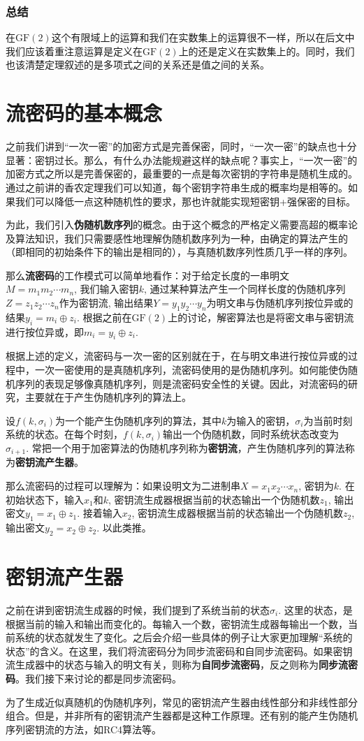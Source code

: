 \documentclass[UTF8]{ctexrep}
\def\pth#1{\left( {#1}\right)}
\def\GF{\mathrm{GF}}
\begin{document}
\subsubsection{总结}
在$\GF\pth{2}$这个有限域上的运算和我们在实数集上的运算很不一样，所以在后文中我们应该着重注意运算是定义在$\GF\pth{2}$上的还是定义在实数集上的。同时，我们也该清楚定理叙述的是多项式之间的关系还是值之间的关系。
\section{流密码的基本概念}
之前我们讲到“一次一密”的加密方式是完善保密，同时，“一次一密”的缺点也十分显著：密钥过长。那么，有什么办法能规避这样的缺点呢？事实上，“一次一密”的加密方式之所以是完善保密的，最重要的一点是每次密钥的字符串是随机生成的。通过之前讲的香农定理我们可以知道，每个密钥字符串生成的概率均是相等的。如果我们可以降低一点这种随机性的要求，那也许就能实现短密钥+强保密的目标。\par
为此，我们引入\textbf{伪随机数序列}的概念。由于这个概念的严格定义需要高超的概率论及算法知识，我们只需要感性地理解伪随机数序列为一种，由确定的算法产生的（即相同的初始条件下的输出是相同的），与真随机数序列性质几乎一样的序列。\par
那么\textbf{流密码}的工作模式可以简单地看作：对于给定长度的一串明文$M=m_1m_2\cdots m_n$, 我们输入密钥$k$, 通过某种算法产生一个同样长度的伪随机序列$Z=z_1z_2\cdots z_n$作为密钥流, 输出结果$Y=y_1y_2\cdots y_n$为明文串与伪随机序列按位异或的结果$y_i=m_i\oplus z_i$. 根据之前在$\GF\pth{2}$上的讨论，解密算法也是将密文串与密钥流进行按位异或，即$m_i=y_i\oplus z_i$.\par
根据上述的定义，流密码与一次一密的区别就在于，在与明文串进行按位异或的过程中，一次一密使用的是真随机序列，流密码使用的是伪随机序列。如何能使伪随机序列的表现足够像真随机序列，则是流密码安全性的关键。因此，对流密码的研究，主要就在于产生伪随机序列的算法上。\par
设$f(k, \sigma_i)$为一个能产生伪随机序列的算法，其中$k$为输入的密钥，$\sigma_i$为当前时刻系统的状态。在每个时刻，$f(k, \sigma_i)$输出一个伪随机数，同时系统状态改变为$\sigma_{i+1}$. 常把一个用于加密算法的伪随机序列称为\textbf{密钥流}，产生伪随机序列的算法称为\textbf{密钥流产生器}。\par
那么流密码的过程可以理解为：如果设明文为二进制串$X=x_1x_2\cdots x_n$, 密钥为$k$. 在初始状态下，输入$x_1$和$k$, 密钥流生成器根据当前的状态输出一个伪随机数$z_1$, 输出密文$y_1=x_1\oplus z_1$. 接着输入$x_2$, 密钥流生成器根据当前的状态输出一个伪随机数$z_2$, 输出密文$y_2=x_2\oplus z_2$. 以此类推。
\section{密钥流产生器}
之前在讲到密钥流生成器的时候，我们提到了系统当前的状态$\sigma_i$. 这里的状态，是根据当前的输入和输出而变化的。每输入一个数，密钥流生成器每输出一个数，当前系统的状态就发生了变化。之后会介绍一些具体的例子让大家更加理解“系统的状态”的含义。在这里，我们将流密码分为同步流密码和自同步流密码。如果密钥流生成器中的状态与输入的明文有关，则称为\textbf{自同步流密码}，反之则称为\textbf{同步流密码}。我们接下来讨论的都是同步流密码。\par
为了生成近似真随机的伪随机序列，常见的密钥流产生器由线性部分和非线性部分组合。但是，并非所有的密钥流产生器都是这种工作原理。还有别的能产生伪随机序列密钥流的方法，如RC4算法等。
\end{document}
